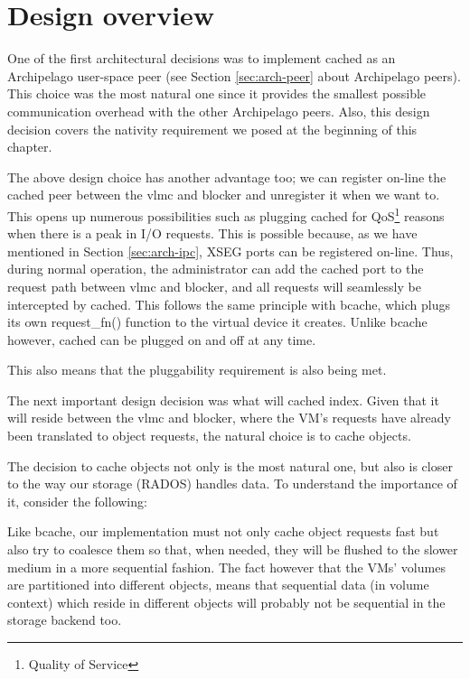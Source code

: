 \section{Design overview}\label{sec:over-design}

One of the first architectural decisions was to implement cached as an 
Archipelago user-space peer (see Section \ref{sec:arch-peer} about Archipelago 
peers). This choice was the most natural one since it provides the smallest 
possible communication overhead with the other Archipelago peers. Also, this 
design decision covers the nativity requirement we posed at the beginning of 
this chapter.

The above design choice has another advantage too; we can register on-line the 
cached peer between the vlmc and blocker and unregister it when we want to.  
This opens up numerous possibilities such as plugging cached for 
QoS\footnote{Quality of Service} reasons when there is a peak in I/O requests.  
This is possible because, as we have mentioned in Section \ref{sec:arch-ipc}, 
XSEG ports can be registered on-line. Thus, during normal operation, the 
administrator can add the cached port to the request path between vlmc and 
blocker, and all requests will seamlessly be intercepted by cached. This 
follows the same principle with bcache, which plugs its own request\_fn() 
function to the virtual device it creates.  Unlike bcache however, cached can 
be plugged on and off at any time.

This also means that the pluggability requirement is also being met.

The next important design decision was what will cached index. Given that it 
will reside between the vlmc and blocker, where the VM's requests have already 
been translated to object requests, the natural choice is to cache objects.  

The decision to cache objects not only is the most natural one, but also is 
closer to the way our storage (RADOS) handles data. To understand the 
importance of it, consider the following:

Like bcache, our implementation must not only cache object requests fast but 
also try to coalesce them so that, when needed, they will be flushed to the 
slower medium in a more sequential fashion. The fact however that the VMs' 
volumes are partitioned into different objects, means that sequential data (in 
volume context) which reside in different objects will probably not be 
sequential in the storage backend too.

